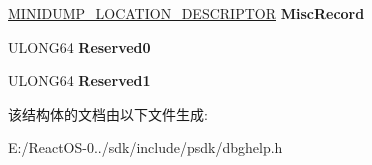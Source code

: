 \begin{DoxyCompactItemize}
\item 
\mbox{\label{struct___m_i_n_i_d_u_m_p___m_o_d_u_l_e_ad46a95aa3468f04bf71c0628e75e9221}} 
\hyperlink{struct___m_i_n_i_d_u_m_p___l_o_c_a_t_i_o_n___d_e_s_c_r_i_p_t_o_r}{M\+I\+N\+I\+D\+U\+M\+P\+\_\+\+L\+O\+C\+A\+T\+I\+O\+N\+\_\+\+D\+E\+S\+C\+R\+I\+P\+T\+OR} {\bfseries Misc\+Record}
\item 
\mbox{\label{struct___m_i_n_i_d_u_m_p___m_o_d_u_l_e_a8342806948752b0bab18e0c9c2a4f89a}} 
U\+L\+O\+N\+G64 {\bfseries Reserved0}
\item 
\mbox{\label{struct___m_i_n_i_d_u_m_p___m_o_d_u_l_e_acb47fa08fdfae245d4b89f16d8dc040c}} 
U\+L\+O\+N\+G64 {\bfseries Reserved1}
\end{DoxyCompactItemize}


该结构体的文档由以下文件生成\+:\begin{DoxyCompactItemize}
\item 
E\+:/\+React\+O\+S-\/0../sdk/include/psdk/dbghelp.\+h\end{DoxyCompactItemize}
